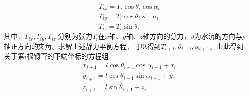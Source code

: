             \begin{align*}
            & T_{ix} = T_i\cos\theta_i\cos\alpha_i\\
            & T_{iy} = T_i\cos\theta_i\sin\alpha_i\\
            & T_{iz} = T_i\sin\theta_i
            \end{align*}
            其中，$T_{ix},T_{iy},T_{iz}$ 分别为张力$T_i$在$x$轴、$y$轴、$z$轴方向的分力，$\beta$为水流的方向与y轴正方向的夹角。求解上述静力平衡方程，可以得到$T_{i+1},\theta_{i+1},\alpha_{i+1}$。由此得到关于第$i$根钢管的下端坐标的方程组
            \begin{align*}
            & x_{i+1} = l\cos\theta_{i+1}\cos\alpha_{i+1}+x_i\\
            & y_{i+1} = l\cos\theta_{i+1}\sin\alpha_{i+1}+y_i\\
            & z_{i+1} = l\sin \theta_{i+1}+z_i
            \end{align*}

